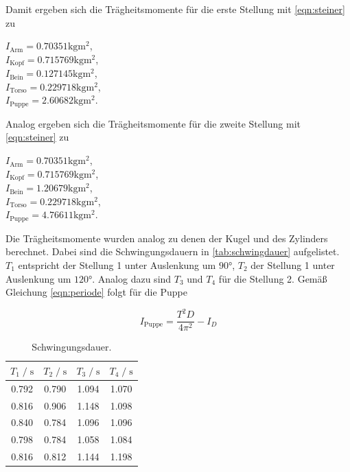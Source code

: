 Damit ergeben sich die Trägheitsmomente für die erste Stellung  mit \autoref{eqn:steiner} zu
\begin{center}
  $I_{\text{Arm}} = 0.70351 \si{\kilogram\meter^2}$, \\
  $I_{\text{Kopf}} = 0.715769 \si{\kilogram\meter^2}$, \\
  $I_{\text{Bein}} = 0.127145 \si{\kilogram\meter^2}$, \\
  $I_{\text{Torso}} = 0.229718 \si{\kilogram\meter^2}$, \\
  $I_{\text{Puppe}} = 2.60682 \si{\kilogram\meter^2}$. \\
\end{center}
Analog ergeben sich die Trägheitsmomente für die zweite Stellung mit \autoref{eqn:steiner} zu
\begin{center}
  $I_{\text{Arm}} = 0.70351 \si{\kilogram\meter^2}$, \\
  $I_{\text{Kopf}} = 0.715769 \si{\kilogram\meter^2}$, \\
  $I_{\text{Bein}} = 1.20679 \si{\kilogram\meter^2}$, \\ 
  $I_{\text{Torso}} = 0.229718 \si{\kilogram\meter^2}$, \\
  $I_{\text{Puppe}} = 4.76611 \si{\kilogram\meter^2}$. \\
\end{center}


Die Trägheitsmomente wurden analog zu denen der Kugel und des Zylinders berechnet. Dabei sind die Schwingungsdauern in \autoref{tab:schwingdauer}
aufgelistet.
$T_1$ entspricht der Stellung 1 unter Auslenkung um $90°$, $T_2$ der Stellung 1 unter Auslenkung um $120°$.
Analog dazu sind $T_3$ und $T_4$ für die Stellung 2. Gemäß Gleichung \autoref{eqn:periode} folgt für die Puppe


\begin{equation*}
  I_{\text{Puppe}} = \frac{T^2D}{4\pi^2} - I_D
\end{equation*}

\begin{table}[H]
    \centering
        \caption{Schwingungsdauer.}
        \label{tab:schwingdauer}
        \begin{tabular}{c c c c}
        \toprule
        $T_1 \;/\; \si{\second}$ & $T_2 \;/\; \si{\second}$ & $T_3 \;/\; \si{\second}$ & $T_4 \;/\; \si{\second}$ \\
        \midrule
        0.792 & 0.790 & 1.094 & 1.070 \\
        0.816 & 0.906 & 1.148 & 1.098 \\
        0.840 & 0.784 & 1.096 & 1.096 \\
        0.798 & 0.784 & 1.058 & 1.084 \\
        0.816 & 0.812 & 1.144 & 1.198 \\
        \bottomrule
    \end{tabular}
\end{table}


